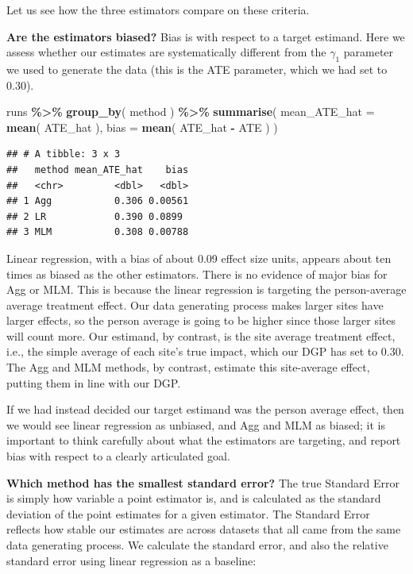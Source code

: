 \documentclass[
]{book}
\newenvironment{Shaded}{\begin{snugshade}}{\end{snugshade}}
\newcommand{\AttributeTok}[1]{\textcolor[rgb]{0.13,0.29,0.53}{#1}}
\newcommand{\FunctionTok}[1]{\textcolor[rgb]{0.13,0.29,0.53}{\textbf{#1}}}
\newcommand{\NormalTok}[1]{#1}
\newcommand{\SpecialCharTok}[1]{\textcolor[rgb]{0.81,0.36,0.00}{\textbf{#1}}}
\begin{document}
Let us see how the three estimators compare on these criteria.

\textbf{Are the estimators biased?}
Bias is with respect to a target estimand.
Here we assess whether our estimates are systematically different from the \(\gamma_1\) parameter we used to generate the data (this is the ATE parameter, which we had set to 0.30).

\begin{Shaded}
\begin{Highlighting}[]
\NormalTok{runs }\SpecialCharTok{\%\textgreater{}\%} 
  \FunctionTok{group\_by}\NormalTok{( method ) }\SpecialCharTok{\%\textgreater{}\%}
  \FunctionTok{summarise}\NormalTok{( }
    \AttributeTok{mean\_ATE\_hat =} \FunctionTok{mean}\NormalTok{( ATE\_hat ),}
    \AttributeTok{bias =} \FunctionTok{mean}\NormalTok{( ATE\_hat }\SpecialCharTok{{-}}\NormalTok{ ATE )  )}
\end{Highlighting}
\end{Shaded}

\begin{verbatim}
## # A tibble: 3 x 3
##   method mean_ATE_hat    bias
##   <chr>         <dbl>   <dbl>
## 1 Agg           0.306 0.00561
## 2 LR            0.390 0.0899 
## 3 MLM           0.308 0.00788
\end{verbatim}

Linear regression, with a bias of about 0.09 effect size units, appears about ten times as biased as the other estimators.
There is no evidence of major bias for Agg or MLM.
This is because the linear regression is targeting the person-average average treatment effect.
Our data generating process makes larger sites have larger effects, so the person average is going to be higher since those larger sites will count more.
Our estimand, by contrast, is the site average treatment effect, i.e., the simple average of each site's true impact, which our DGP has set to 0.30.
The Agg and MLM methods, by contrast, estimate this site-average effect, putting them in line with our DGP.

If we had instead decided our target estimand was the person average effect, then we would see linear regression as unbiased, and Agg and MLM as biased; it is important to think carefully about what the estimators are targeting, and report bias with respect to a clearly articulated goal.

\textbf{Which method has the smallest standard error?}
The true Standard Error is simply how variable a point estimator is, and is calculated as the standard deviation of the point estimates for a given estimator.
The Standard Error reflects how stable our estimates are across datasets that all came from the same data generating process.
We calculate the standard error, and also the relative standard error using linear regression as a baseline:
\end{document}
